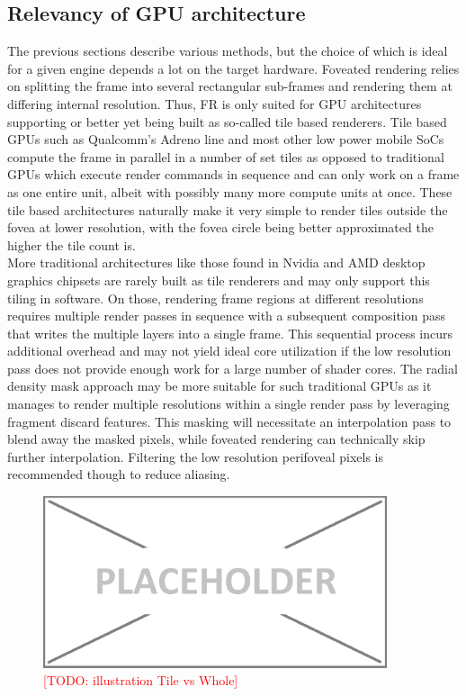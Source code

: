 \subsection{Relevancy of GPU architecture}
The previous sections describe various methods, but the choice of which is ideal for a given engine depends a lot on the target hardware. Foveated rendering relies on splitting the frame into several rectangular sub-frames and rendering them at differing internal resolution. Thus, FR is only suited for GPU architectures supporting or better yet being built as so-called tile based renderers. Tile based GPUs such as Qualcomm's Adreno line and most other low power mobile SoCs compute the frame in parallel in a number of set tiles as opposed to traditional GPUs which execute render commands in sequence and can only work on a frame as one entire unit, albeit with possibly many more compute units at once. These tile based architectures naturally make it very simple to render tiles outside the fovea at lower resolution, with the fovea circle being better approximated the higher the tile count is. \\
More traditional architectures like those found in Nvidia and AMD desktop graphics chipsets are rarely built as tile renderers and may only support this tiling in software. On those, rendering frame regions at different resolutions requires multiple render passes in sequence with a subsequent composition pass that writes the multiple layers into a single frame. This sequential process incurs additional overhead and may not yield ideal core utilization if the low resolution pass does not provide enough work for a large number of shader cores. The radial density mask approach may be more suitable for such traditional GPUs as it manages to render multiple resolutions within a single render pass by leveraging fragment discard features. This masking will necessitate an interpolation pass to blend away the masked pixels, while foveated rendering can technically skip further interpolation. Filtering the low resolution perifoveal pixels is recommended though to reduce aliasing. 

\begin{figure}[htb]
  \centering
  \includegraphics[width=0.9\textwidth]{pictures/placeholder}
  \caption{\textcolor{red}{[TODO: illustration Tile vs Whole]}} \label{fig:blob}
\end{figure}